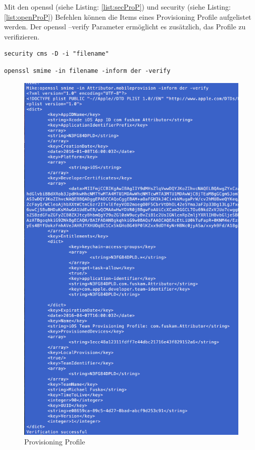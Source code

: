 Mit den \glqq openssl\grqq{} (siehe Listing: \ref{list:secProP}) und \glqq security\grqq{} (siehe Listing: \ref{list:openProP}) Befehlen können die Items eines Provisioning Profile aufgelistet werden. Der \glqq openssl --verify\grqq{} Parameter ermöglicht es zusätzlich, das Profile zu verifizieren. 
\newline

\lstset{
    language=bash,
    }
\begin{lstlisting}[captionpos=b, caption={Befehl: security}, label=list:secProP]
security cms -D -i "filename" 
\end{lstlisting}

\begin{lstlisting}[captionpos=b, caption={Befehl: openssl -- (Siehe Abbildung: \ref{fig:ProvisioningProfile})}, label=list:openProP]
openssl smime -in filename -inform der -verify
\end{lstlisting}

\begin{figure}[htp!]
        \centering
                \includegraphics[scale=0.6]{SGML-Format}
        \caption{Provisioning Profile}
        \label{fig:ProvisioningProfile}
\end{figure}

